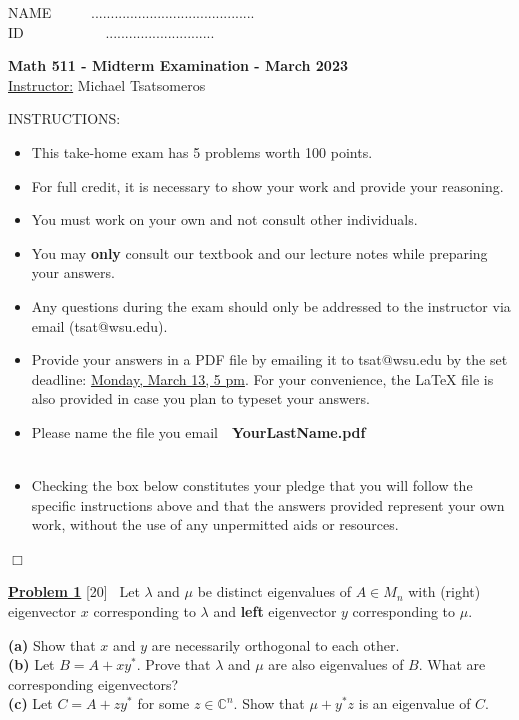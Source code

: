 \documentclass [11pt]{article}
\newcommand{\CC}{\mathbb{C}}
\begin{document}
\hspace*{2.5in} NAME \ \ \ \ \ ..........................................\\
\hspace*{2.5in} ID \ \ \ \ \ \ \ \ \ \ \ ............................
\begin{center}
{\large\bf Math 511 - Midterm Examination - March 2023} \\ 
\underline{Instructor:} Michael Tsatsomeros
\end{center}

INSTRUCTIONS:

\begin{itemize}
\item 
This take-home exam has 5 problems worth 100 points.
\item
For full credit, it is necessary to show your work and provide your reasoning.
\item
You must work on your own and not consult other individuals.
\item
You may {\bf only} consult our textbook and our lecture notes while preparing your answers.
\item
Any questions during the exam should only be addressed to the instructor 
via email (tsat@wsu.edu).
\item 
Provide your answers in a PDF file by emailing it to tsat@wsu.edu by the set deadline: 
\underline{Monday, March 13, 5 pm}. For your convenience, the LaTeX file is also provided in 
case you plan to typeset your answers.
\item 
Please name the file you email\ \ {\bf YourLastName.pdf}
\\ \\
\item
Checking the box below constitutes your pledge that you will follow the specific instructions above and that the answers provided represent your own work, without the use of any unpermitted aids or resources.
\end{itemize}

\begin{center}
{\Huge $ \Box$}\ \ \
\end{center}


\newpage


\underline{\bf Problem 1} [20] \ 
Let $\lambda$ and $\mu$ be distinct eigenvalues of $A\in M_n$ with (right) eigenvector $x$
corresponding to $\lambda$ and {\bf left} eigenvector $y$ corresponding to $\mu$. 

{\bf (a)} Show that $x$ and $y$ are necessarily orthogonal to each other.
\vspace{2.75in}\\
{\bf (b)} Let $B=A+xy^*$. Prove that $\lambda$ and $\mu$ are also eigenvalues of $B$. What are corresponding eigenvectors?
\vspace{2in}\\
{\bf (c)} Let $C=A+zy^*$ for some $z\in\CC^n$. Show that $\mu+y^*z$ is an eigenvalue of $C$. 
\end{document}
